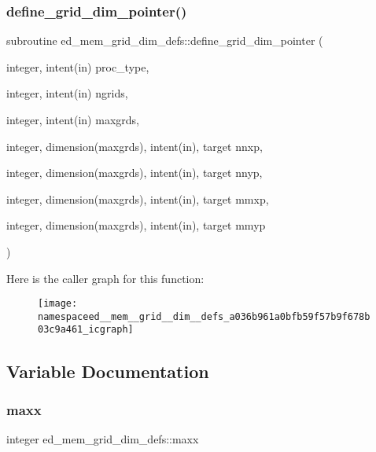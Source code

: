 \subsubsection{\texorpdfstring{define\+\_\+grid\+\_\+dim\+\_\+pointer()}{define\_grid\_dim\_pointer()}}
{\footnotesize\ttfamily subroutine ed\+\_\+mem\+\_\+grid\+\_\+dim\+\_\+defs\+::define\+\_\+grid\+\_\+dim\+\_\+pointer (\begin{DoxyParamCaption}\item[{integer, intent(in)}]{proc\+\_\+type,  }\item[{integer, intent(in)}]{ngrids,  }\item[{integer, intent(in)}]{maxgrds,  }\item[{integer, dimension(maxgrds), intent(in), target}]{nnxp,  }\item[{integer, dimension(maxgrds), intent(in), target}]{nnyp,  }\item[{integer, dimension(maxgrds), intent(in), target}]{mmxp,  }\item[{integer, dimension(maxgrds), intent(in), target}]{mmyp }\end{DoxyParamCaption})}

Here is the caller graph for this function\+:
\nopagebreak
\begin{figure}[H]
\begin{center}
\leavevmode
\texttt{[image: namespaceed\_\_mem\_\_grid\_\_dim\_\_defs\_a036b961a0bfb59f57b9f678b03c9a461\_icgraph]}
\end{center}
\end{figure}


\subsection{Variable Documentation}
\mbox{\label{namespaceed__mem__grid__dim__defs_a53ce5ed3feaad0ea89bb77b8fc3fa220}} 
\subsubsection{\texorpdfstring{maxx}{maxx}}
{\footnotesize\ttfamily integer ed\+\_\+mem\+\_\+grid\+\_\+dim\+\_\+defs\+::maxx}

\mbox{\label{namespaceed__mem__grid__dim__defs_a83f50efdee1a0d683634a441b608b988}} 
